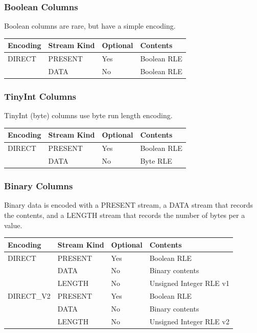 \documentclass{article}
\begin{document}
\subsubsection{Boolean Columns}

Boolean columns are rare, but have a simple encoding.

\vspace{10pt}
\begin{tabular}{| l | l | l | l |}
\hline
Encoding & Stream Kind & Optional & Contents \\
\hline
DIRECT & PRESENT & Yes & Boolean RLE\\
       & DATA    & No  & Boolean RLE\\
\hline
\end{tabular}

\subsubsection{TinyInt Columns}

TinyInt (byte) columns use byte run length encoding.

\vspace{10pt}
\begin{tabular}{| l | l | l | l |}
\hline
Encoding & Stream Kind & Optional & Contents \\
\hline
DIRECT & PRESENT & Yes & Boolean RLE\\
       & DATA    & No  & Byte RLE\\
\hline
\end{tabular}

\subsubsection{Binary Columns}

Binary data is encoded with a PRESENT stream, a DATA stream that records
the contents, and a LENGTH stream that records the number of bytes per a
value.

\vspace{10pt}
\begin{tabular}{| l | l | l | l |}
\hline
Encoding & Stream Kind & Optional & Contents \\
\hline
DIRECT & PRESENT & Yes & Boolean RLE\\
       & DATA    & No  & Binary contents\\
       & LENGTH  & No  & Unsigned Integer RLE v1\\
\hline
DIRECT\_V2 & PRESENT & Yes & Boolean RLE\\
          & DATA    & No  & Binary contents\\
          & LENGTH  & No  & Unsigned Integer RLE v2\\
\hline
\end{tabular}
\end{document}
